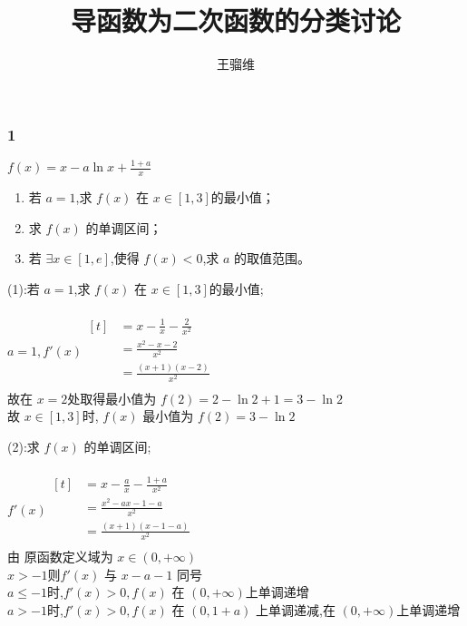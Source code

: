 \documentclass{ctexbeamer}
\begin{document}
\title{导函数为二次函数的分类讨论}
\author{王骝维}

\frame{\titlepage}

\frametitle{1}
\begin{frame}

    $f(x)=x-a\ln{x}+\frac{1+a}{x}$
    \begin{enumerate}[label=(\arabic*)]
        \item   若 $a=1$,求 $f(x)$ 在 $x \in [1,3]$的最小值；
\item   求 $f(x)$ 的单调区间；
\item   若 $\exists x \in [1,e]$,使得 $f(x)<0$,求 $a$ 的取值范围。
    \end{enumerate}

\end{frame}

\begin{frame}
(1):若 $a=1$,求 $f(x)$ 在 $x \in [1,3]$的最小值;\\
\quad\\
    $a=1,f'(x)
        \begin{aligned}[t]
             & =x-\frac{1}{x}-\frac{2}{x^2} \\
             & =\frac{x^2-x-2}{x^2}         \\
             & =\frac{(x+1)(x-2)}{x^2}      \\
\end{aligned}$\\
    故在 $x=2$处取得最小值为 $f(2)=2-\ln{2}+1=3-\ln{2}$\\
故 $x \in [1,3]$时, $f(x)$ 最小值为 $f(2)=3-\ln{2}$\\
\end{frame}

\begin{frame}
(2):求 $f(x)$ 的单调区间;\\
\quad\\
    $f'(x)
        \begin{aligned}[t]
             & =x-\frac{a}{x}-\frac{1+a}{x^2} \\
             & =\frac{x^2-ax-1-a}{x^2}        \\
             & =\frac{(x+1)(x-1-a)}{x^2}      \\
\end{aligned}$\\
    由 原函数定义域为 $x\in(0,+\infty)$\\
$x>-1$则$ f'(x)$ 与 $x-a-1$ 同号\\
$a \leqslant -1$时,$f'(x)>0,f(x)$ 在 $(0,+\infty)$上单调递增\\
$a> -1$时,$f'(x)>0,f(x)$ 在 $(0,1+a)$ 上单调递减,在 $(0,+\infty)$上单调递增\\

\end{frame}
\end{document}
